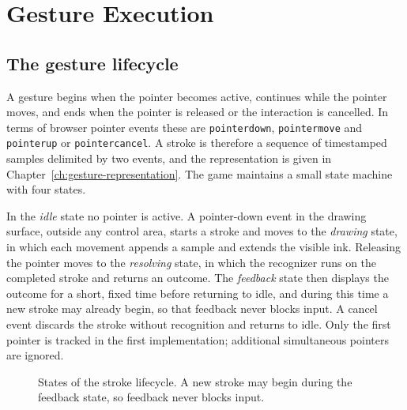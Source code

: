 \chapter{Gesture Execution}\label{ch:execution}

\section{The gesture lifecycle}

A gesture begins when the pointer becomes active, continues while the pointer moves, and ends when the pointer is released or the interaction is cancelled. In terms of browser pointer events these are \texttt{pointerdown}, \texttt{pointermove} and \texttt{pointerup} or \texttt{pointercancel}. A stroke is therefore a sequence of timestamped samples delimited by two events, and the representation is given in Chapter~\ref{ch:gesture-representation}. The game maintains a small state machine with four states.

In the \emph{idle} state no pointer is active. A pointer-down event in the drawing surface, outside any control area, starts a stroke and moves to the \emph{drawing} state, in which each movement appends a sample and extends the visible ink. Releasing the pointer moves to the \emph{resolving} state, in which the recognizer runs on the completed stroke and returns an outcome. The \emph{feedback} state then displays the outcome for a short, fixed time before returning to idle, and during this time a new stroke may already begin, so that feedback never blocks input. A cancel event discards the stroke without recognition and returns to idle. Only the first pointer is tracked in the first implementation; additional simultaneous pointers are ignored.

\begin{figure}[t]
\centering
{}
\caption{States of the stroke lifecycle. A new stroke may begin during the feedback state, so feedback never blocks input.}
\label{fig:lifecycle}
\end{figure}

